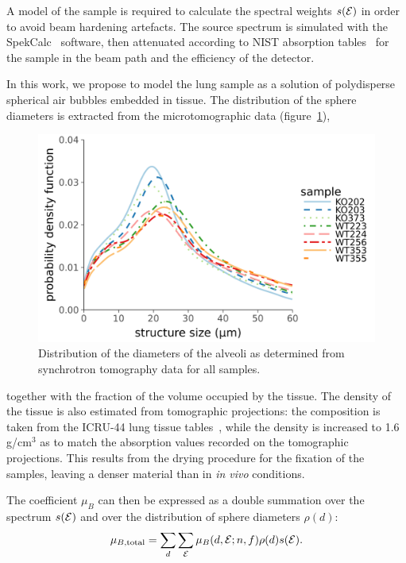 A model of the sample is required to calculate the spectral weights
$s(\mathcal{E})$ in order to avoid beam hardening artefacts. The source spectrum is
simulated with the SpekCalc~\parencite{spekcalc} software, then attenuated
according to NIST absorption tables~\parencite{Hubbell_1995} for the sample in the beam path and the
efficiency of the detector.

In this work, we propose to model the lung sample as a solution of
polydisperse spherical air bubbles embedded in tissue. The distribution of
the sphere diameters is extracted from the microtomographic data
(figure~\ref{fig:sizepdf}),
\begin{figure}[htb]
    \centering
    \includegraphics[width=\textwidth]{gfx/lung-paper-figures/size_pdf.png}
    \caption{Distribution of the diameters of the alveoli as determined from
    synchrotron tomography data for all samples.}
    \label{fig:sizepdf}
\end{figure}
together
with the fraction of the volume occupied by the tissue. The density of the
tissue is also estimated from tomographic projections: the composition is
taken from the ICRU-44 lung tissue tables~\parencite{White_1989}, while the density is increased to
1.6 g/cm$^3$ as to match the absorption values recorded on the tomographic
projections. This results from the drying procedure for the fixation of
the samples, leaving a denser material than in \emph{in vivo} conditions.

The coefficient $\mu_B$ can then be expressed as a double summation over the spectrum
$s(\mathcal{E})$ and over the distribution of sphere diameters $\rho(d)$:
\begin{equation}
    \mu_{B,\text{total}} = \sum_{d}\sum_{\mathcal{E}} \mu_B(d, \mathcal{E}; n, f)\rho(d)s(\mathcal{E})
    \label{eqn:totalsum}.
\end{equation}


